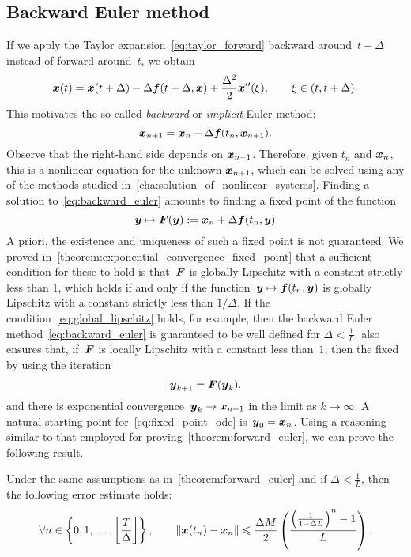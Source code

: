 \subsection{Backward Euler method}
\label{sub:implicit_euler}
If we apply the Taylor expansion~\eqref{eq:taylor_forward} backward around~$t + \Delta$ instead of forward around~$t$,
we obtain
\[
    \label{eq:taylor_forward}
    \vect x(t) = \vect x(t + \Delta) - \Delta \vect f(t + \Delta, \vect x) + \frac{\Delta^2}{2} \vect x''(\xi),
    \qquad \xi \in (t, t+\Delta).
\]
This motivates the so-called \emph{backward} or \emph{implicit} Euler method:
\begin{equation}
    \label{eq:backward_euler}
    \vect x_{n+1} = \vect x_{n} + \Delta \vect f(t_n, \vect x_{n+1}).
\end{equation}
Observe that the right-hand side depends on $\mathbf{\boldsymbol{x}}_{n+1}$.
Therefore, given $t_n$ and $\mathbf{\boldsymbol{x}}_n$,
this is a nonlinear equation for the unknown $\mathbf{\boldsymbol{x}}_{n+1}$,
which can be solved using any of the methods studied in~\cref{cha:solution_of_nonlinear_systems}.
Finding a solution to~\eqref{eq:backward_euler} amounts to finding a fixed point of the function
\[
    \mathbf{\boldsymbol{y}} \mapsto \mathbf{\boldsymbol{F}}(\mathbf{\boldsymbol{y}}) := \mathbf{\boldsymbol{x}}_{n} + \Delta \mathbf{\boldsymbol{f}}(t_n, \mathbf{\boldsymbol{y}})
\]
A priori, the existence and uniqueness of such a fixed point is not guaranteed.
We proved in~\cref{theorem:exponential_convergence_fixed_point} that a sufficient condition for these to hold is
that~$\mathbf{\boldsymbol{F}}$ is globally Lipschitz with a constant strictly less than 1,
which holds if and only if the function~$\mathbf{\boldsymbol{y}} \mapsto \mathbf{\boldsymbol{f}}(t_n, \mathbf{\boldsymbol{y}})$ is globally Lipschitz with a constant strictly less than $1/\Delta$.
If the condition~\eqref{eq:global_lipschitz} holds, for example,
then the backward Euler method~\eqref{eq:backward_euler} is guaranteed to be well defined for $\Delta < \frac{1}{L}$.
 also ensures that, if~$\mathbf{\boldsymbol{F}}$ is locally Lipschitz with a constant less than~$1$,
then the fixed by using the iteration
\begin{equation}
    \label{eq:fixed_point_ode}
    \vect y_{k+1} = \vect F(\vect y_k).
\end{equation}
and there is exponential convergence~$\mathbf{\boldsymbol{y}}_k \to \mathbf{\boldsymbol{x}}_{n+1}$ in the limit as $k \to \infty$.
A natural starting point for~\eqref{eq:fixed_point_ode} is~$\mathbf{\boldsymbol{y}}_0 = \mathbf{\boldsymbol{x}}_n$.
Using a reasoning similar to that employed for proving~\cref{theorem:forward_euler},
we can prove the following result.
\begin{theorem}
    Under the same assumptions as in~\cref{theorem:forward_euler} and if $\Delta < \frac{1}{L}$,
    then the following error estimate holds:
    \begin{equation}
        \label{eq:estimate_backward_euler}
        \forall n \in \left\{0, 1, \dotsc, \floor*{\frac{T}{\Delta}} \right\},
        \qquad
        \vecnorm{\vect x(t_n) - \vect x_n}
        \leq
        \frac{\Delta M}{2} \left( \frac{\left( \frac{1}{1 - \Delta L} \right)^n - 1}{L} \right).
    \end{equation}
\end{theorem}
